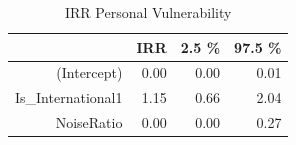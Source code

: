 \begin{table}[ht]
\centering
\begin{tabular}{rrrr}
  \hline
 & IRR & 2.5 \% & 97.5 \% \\ 
  \hline
(Intercept) & 0.00 & 0.00 & 0.01 \\ 
  Is\_International1 & 1.15 & 0.66 & 2.04 \\ 
  NoiseRatio & 0.00 & 0.00 & 0.27 \\ 
   \hline
\end{tabular}
\caption{IRR Personal Vulnerability} 
\end{table}
